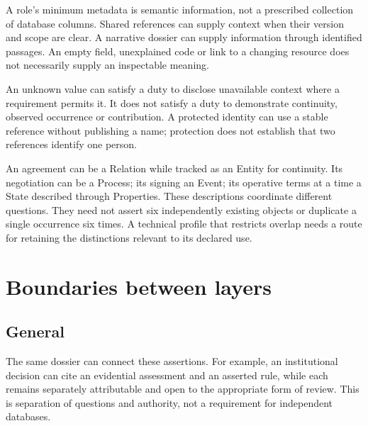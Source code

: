 \documentclass[11pt,a4paper]{article}
\begin{document}
A role's minimum metadata is semantic information, not a prescribed collection of database columns. Shared references can supply context when their version and scope are clear. A narrative dossier can supply information through identified passages. An empty field, unexplained code or link to a changing resource does not necessarily supply an inspectable meaning.

An unknown value can satisfy a duty to disclose unavailable context where a requirement permits it. It does not satisfy a duty to demonstrate continuity, observed occurrence or contribution. A protected identity can use a stable reference without publishing a name; protection does not establish that two references identify one person.

An agreement can be a Relation while tracked as an Entity for continuity. Its negotiation can be a Process; its signing an Event; its operative terms at a time a State described through Properties. These descriptions coordinate different questions. They need not assert six independently existing objects or duplicate a single occurrence six times. A technical profile that restricts overlap needs a route for retaining the distinctions relevant to its declared use.

\section{Boundaries between layers}
\subsection{General}



The same dossier can connect these assertions. For example, an institutional decision can cite an evidential assessment and an asserted rule, while each remains separately attributable and open to the appropriate form of review. This is separation of questions and authority, not a requirement for independent databases.
\end{document}

